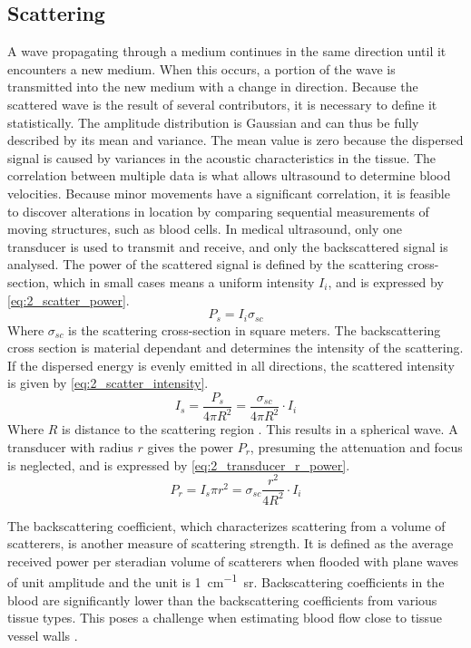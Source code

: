 \subsection{Scattering}
A wave propagating through a medium continues in the same direction until it encounters a new medium. When this occurs, a portion of the wave is transmitted into the new medium with a change in direction. Because the scattered wave is the result of several contributors, it is necessary to define it statistically. The amplitude distribution is Gaussian \cite{JensenUltrasoundBook} and can thus be fully described by its mean and variance. The mean value is zero because the dispersed signal is caused by variances in the acoustic characteristics in the tissue. The correlation between multiple data is what allows ultrasound to determine blood velocities. Because minor movements have a significant correlation, it is feasible to discover alterations in location by comparing sequential measurements of moving structures, such as blood cells. In medical ultrasound, only one transducer is used to transmit and receive, and only the backscattered signal is analysed. The power of the scattered signal is defined by the scattering cross-section, which in small cases means a uniform intensity $I_{i}$, and is expressed by \cref{eq:2_scatter_power}.
\begin{equation} \label{eq:2_scatter_power}
	P_{s} = I_{i} \sigma_{s c}
\end{equation}
Where $\sigma_{s c}$ is the scattering cross-section in square meters. The backscattering cross section is material dependant and determines the intensity of the scattering. If the dispersed energy is evenly emitted in all directions, the scattered intensity is given by \cref {eq:2_scatter_intensity}.
\begin{equation} \label{eq:2_scatter_intensity}
	I_{s} = \frac{P_{s}}{4 \pi R^{2}} = \frac{\sigma_{sc}}{4 \pi R^{2}} \cdot I_{i}
\end{equation}
Where $R$ is distance to the scattering region \cite{JensenUltrasoundBook}. This results in a spherical wave. A transducer with radius $r$ gives the power $P_{r}$, presuming the attenuation and focus is neglected, and is expressed by \cref{eq:2_transducer_r_power}.
\begin{equation} \label{eq:2_transducer_r_power}
	P_{r} = I_{s} \pi r^{2} = \sigma_{s c} \frac{r^{2}}{4 R^{2}} \cdot I_{i}
\end{equation}

The backscattering coefficient, which characterizes scattering from a volume of scatterers, is another measure of scattering strength. It is defined as the average received power per steradian volume of scatterers when flooded with plane waves of unit amplitude and the unit is \unit{1\per\centi\meter\steradian}. Backscattering coefficients in the blood are significantly lower than the backscattering coefficients from various tissue types. This poses a challenge when estimating blood flow close to tissue vessel walls \cite{ShungScattering1992,JensenUltrasoundBook}.

